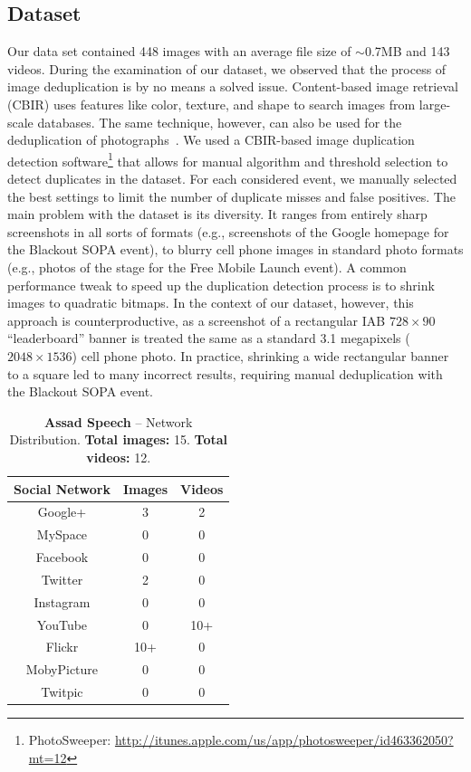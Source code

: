 \documentclass{acm_proc_article-sp}
\newcommand{\inlinelistingsize}{\fontsize{8pt}{11pt}}
\let\oldurl\url
\renewcommand{\url}[1]{\inlinelistingsize\oldurl{#1}}
\begin{document}
\subsection{Dataset} \label{subsec:dataset}
Our data set contained 448 images with an average file size of $\sim$0.7MB and 143 videos.
During the examination of our dataset, we observed that the process of image deduplication is by no means a solved issue.
Content-based image retrieval (CBIR) uses features like color, texture, and shape to search images from large-scale databases.
The same technique, however, can also be used for the deduplication of photographs~\cite{Pattabhi2011}.
We used a CBIR-based image duplication detection software\footnote{PhotoSweeper: \url{http://itunes.apple.com/us/app/photosweeper/id463362050?mt=12}} that allows for manual algorithm and threshold selection to detect duplicates in the dataset.
For each considered event, we manually selected the best settings to limit the number of duplicate misses and false positives.
The main problem with the dataset is its diversity.
It ranges from entirely sharp screenshots in all sorts of formats (e.g., screenshots of the Google homepage for the Blackout SOPA event), to blurry cell phone images in standard photo formats (e.g., photos of the stage for the Free Mobile Launch event).
A common performance tweak to speed up the duplication detection process is to shrink images to quadratic bitmaps.
In the context of our dataset, however, this approach is counterproductive, as a screenshot of a rectangular IAB $728 \times 90$ ``leaderboard'' banner is treated the same as a standard 3.1 megapixels ($2048 \times 1536$) cell phone photo.
In practice, shrinking a wide rectangular banner to a square led to many incorrect results, requiring manual deduplication with the Blackout SOPA event.

\begin{table}[htbp]
  \begin{tabular}{ | c | c | c | }
    \hline
    \textbf{Social Network} & \textbf{Images} & \textbf{Videos}\\
    \hline
    Google+ & 3 & 2\\
    MySpace & 0 & 0\\
    Facebook & 0 & 0\\
    Twitter & 2 & 0\\
    Instagram & 0 & 0\\
    YouTube & 0 & 10+\\
    Flickr & 10+ & 0\\
    MobyPicture & 0 & 0\\
    Twitpic & 0 & 0\\
    \hline
  \end{tabular}
  \label{tab:assad}
  \caption{\textbf{Assad Speech} -- Network Distribution. \textbf{Total images:} 15. \textbf{Total videos:} 12.}
\end{table}
\end{document}
